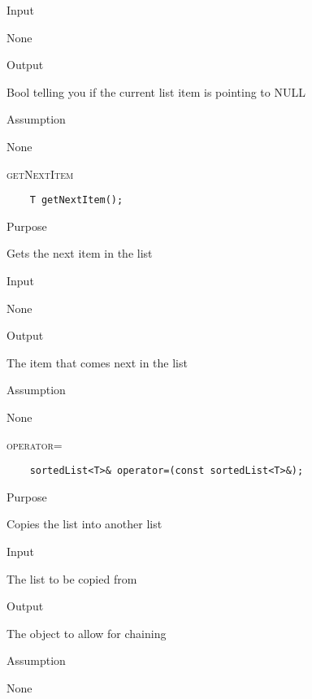 \documentclass[pdftex, 11pt]{article}
\begin{document}
\begin{description}
\begin{description}
			\item{Input}

				None

			\item{Output}

				Bool telling you if the current list item is pointing to NULL

			\item{Assumption}

				None

		\end{description}

	\item{\textsc{getNextItem}}
\begin{lstlisting}
	T getNextItem();
\end{lstlisting}

		\begin{description}

			\item{Purpose}

				Gets the next item in the list

			\item{Input}

				None

			\item{Output}

				The item that comes next in the list

			\item{Assumption}

				None

		\end{description}


	\item{\textsc{operator=}}
\begin{lstlisting}
	sortedList<T>& operator=(const sortedList<T>&);
\end{lstlisting}

		\begin{description}

			\item{Purpose}

				Copies the list into another list

			\item{Input}

				The list to be copied from

			\item{Output}

				The object to allow for chaining

			\item{Assumption}

				None

		\end{description}

\end{description}
\end{document}
